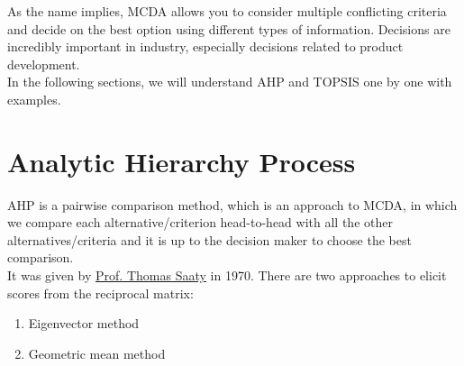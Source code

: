 \documentclass[10pt, a4paper]{article}
\begin{document}
As the name implies, MCDA allows you to consider multiple conflicting criteria and decide on the best option using different types of information. 
Decisions are incredibly important in industry, especially decisions related to product development.\\
In the following sections, we will understand AHP and TOPSIS one by one with examples.
\section{Analytic Hierarchy Process}
 AHP is a pairwise comparison method, which is an approach to MCDA, in which we compare each alternative/criterion head-to-head with all the other alternatives/criteria and it is up to the decision maker to choose the best comparison.\\
 It was given by \underline \href{https://en.wikipedia.org/wiki/Thomas_L._Saaty}{Prof. Thomas Saaty} in 1970. 
There are two approaches to elicit scores from the reciprocal matrix:
\begin{enumerate}[noitemsep]
    \item Eigenvector method
    \item Geometric mean method
\end{enumerate}
\end{document}
